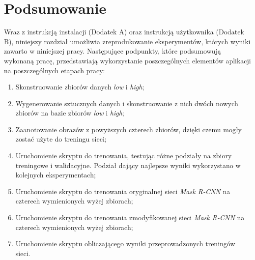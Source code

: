 \section{Podsumowanie}
Wraz z instrukcją instalacji (Dodatek A) oraz instrukcją użytkownika (Dodatek B), niniejszy rozdział umożliwia zreprodukowanie eksperymentów, których wyniki zawarto w niniejszej pracy.
Następujące podpunkty, które podsumowują wykonaną pracę, przedstawiają wykorzystanie poszczególnych elementów aplikacji na poszczególnych etapach pracy:

\begin{enumerate}
 \item Skonstruowanie zbiorów danych \textit{low} i \textit{high};
 \item Wygenerowanie sztucznych danych i skonstruowanie z nich dwóch nowych zbiorów na bazie zbiorów \textit{low} i \textit{high};
 \item Zaanotowanie obrazów z powyższych czterech zbiorów, dzięki czemu mogły zostać użyte do treningu sieci;
 \item Uruchomienie skryptu do trenowania, testując różne podziały na zbiory treningowe i walidacyjne. Podział dający najlepsze wyniki wykorzystano w kolejnych eksperymentach;
 \item Uruchomienie skryptu do trenowania oryginalnej sieci \textit{Mask R-CNN} na czterech wymienionych wyżej zbiorach;
 \item Uruchomienie skryptu do trenowania zmodyfikowanej sieci \textit{Mask R-CNN} na czterech wymienionych wyżej zbiorach;
 \item Uruchomienie skryptu obliczającego wyniki przeprowadzonych treningów sieci.
\end{enumerate}
